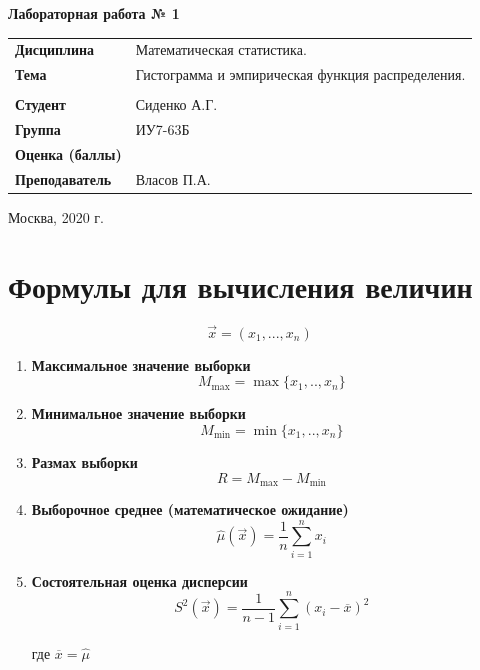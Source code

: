 \documentclass[a4paper,14pt]{extreport} %
\begin{document}
\begin{titlepage}
    \vspace{2cm}

    \begin{center}
        \textbf{Лабораторная работа № 1} \\
        \vspace{0.5cm}
    \end{center}

    \vspace{4cm}

    \begin{flushleft}
        \begin{tabular}{ll}
            \textbf{Дисциплина} & Математическая статистика.  \\
            \textbf{Тема} & Гистограмма и эмпирическая функция распределения.   \\
            \\
            \textbf{Студент} & Сиденко А.Г. \\
            \textbf{Группа} & ИУ7-63Б \\
            \textbf{Оценка (баллы)} & \\
            \textbf{Преподаватель} & Власов П.А.   \\
        \end{tabular}
    \end{flushleft}

    \vspace{4cm}

   \begin{center}
        Москва, 2020 г.
    \end{center}

\end{titlepage}

\section{Формулы для вычисления величин}

$$\vec x=(x_1, ..., x_n)$$

\begin{enumerate}
\item \textbf{Максимальное значение выборки}
$$M_{\max} = \max\{x_1, .., x_n\}$$
\item \textbf{Минимальное значение выборки}
$$M_{\min} = \min\{x_1, .., x_n\}$$
\item \textbf{Размах выборки}
$$R = M_{\max} - M_{\min}$$
\item \textbf{Выборочное среднее (математическое ожидание)}
$$\hat \mu(\vec x) = \frac{1}{n} \sum_{i=1}^n x_i$$
\item \textbf{Состоятельная оценка дисперсии}
$$S^2 (\vec x) = \frac{1}{n-1} \sum_{i=1}^n (x_i - \overline x)^2$$

где $ \overline{x} = \hat \mu $
\end{enumerate}
\end{document}
